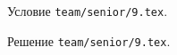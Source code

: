 \problem
Условие \texttt{team/senior/9.tex}.

\solution Решение \texttt{team/senior/9.tex}.
\endproblem
